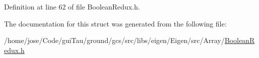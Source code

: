 Definition at line 62 of file Boolean\-Redux.\-h.



The documentation for this struct was generated from the following file\-:\begin{DoxyCompactItemize}
\item 
/home/jose/\-Code/gui\-Tau/ground/gcs/src/libs/eigen/\-Eigen/src/\-Array/\hyperlink{_boolean_redux_8h}{Boolean\-Redux.\-h}\end{DoxyCompactItemize}
